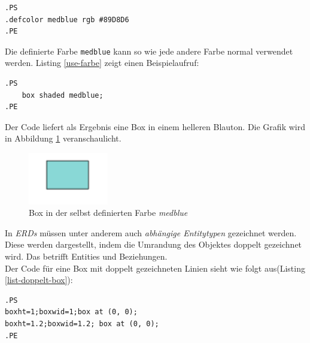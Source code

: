 \noindent
\lstset{frame=lines}
\lstset{basicstyle=\footnotesize}
\begin{lstlisting}
.PS
.defcolor medblue rgb #89D8D6
.PE
\end{lstlisting} 

\noindent
Die definierte Farbe \verb|medblue| kann so wie jede andere Farbe normal verwendet werden. Listing \ref{use-farbe} zeigt einen Beispielaufruf:
\\
\noindent
\lstset{frame=lines}
\lstset{basicstyle=\footnotesize}
\begin{lstlisting}
.PS
    box shaded medblue;
.PE
\end{lstlisting}

\noindent
Der Code liefert als Ergebnis eine Box in einem helleren Blauton. Die Grafik wird in Abbildung \ref{Farbe_def} veranschaulicht.
\\ 
\begin{figure}[H]
	\begin{center}
		\includegraphics[width=3.5cm]{images/Box_Medblue.png}
		\caption{Box in der selbst definierten Farbe \textit{medblue}}
		\label{Farbe_def}
	\end{center}
\end{figure}
\noindent
\pra
In \textit{ERDs} müssen unter anderem auch \textit{abhängige Entitytypen} gezeichnet werden. Diese werden dargestellt, indem die Umrandung des Objektes doppelt gezeichnet wird. Das betrifft Entities und Beziehungen. 
\\

\noindent
Der Code für eine Box mit doppelt gezeichneten Linien sieht wie folgt aus(Listing \ref{list-doppelt-box}):
\\
\noindent
\lstset{frame=lines}
\lstset{basicstyle=\footnotesize}
\begin{lstlisting}
.PS
boxht=1;boxwid=1;box at (0, 0);
boxht=1.2;boxwid=1.2; box at (0, 0);
.PE
\end{lstlisting}

